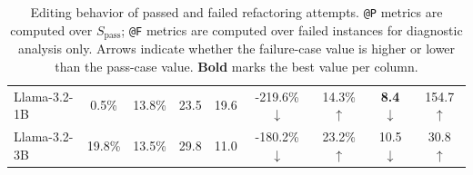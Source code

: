 \begin{table}[t]
{\begin{tabular}{l cccc cccc}
Llama-3.2-1B & 0.5\% & 13.8\% & 23.5 & 19.6 & -219.6\% \textcolor{red!70!black}{$\downarrow$} & 14.3\% \textcolor{red!70!black}{$\uparrow$} & \textbf{8.4} \textcolor{green!70!black}{$\downarrow$} & 154.7 \textcolor{red!70!black}{$\uparrow$} \\
Llama-3.2-3B & 19.8\% & 13.5\% & 29.8 & 11.0 & -180.2\% \textcolor{red!70!black}{$\downarrow$} & 23.2\% \textcolor{red!70!black}{$\uparrow$} & 10.5 \textcolor{green!70!black}{$\downarrow$} & 30.8 \textcolor{red!70!black}{$\uparrow$} \\
\bottomrule
\end{tabular}
}
\caption{Editing behavior of passed and failed refactoring attempts. \texttt{@P} metrics are computed over $S_{\text{pass}}$; \texttt{@F} metrics are computed over failed instances for diagnostic analysis only. Arrows indicate whether the failure-case value is higher or lower than the pass-case value. \textbf{Bold} marks the best value per column.}
\label{tab:failure_analysis}
\end{table}